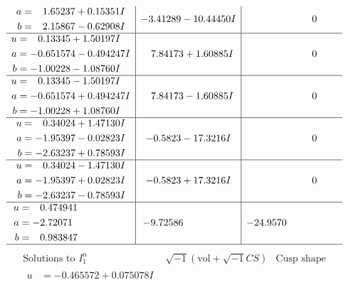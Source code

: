 \documentclass[1p]{elsarticle_modified}
\theoremstyle{definition}
\newcommand{\I}{\sqrt{-1}}
\begin{document}
$$\begin{array}{c|c|c}
\begin{aligned}
a &= \phantom{-}1.65237 + 0.15351 I \\
b &= \phantom{-}2.15867 - 0.62908 I\end{aligned}
 & -3.41289 - 10.44450 I & \phantom{-0.000000 } 0 \\ \hline\begin{aligned}
u &= \phantom{-}0.13345 + 1.50197 I \\
a &= -0.651574 - 0.494247 I \\
b &= -1.00228 - 1.08760 I\end{aligned}
 & \phantom{-}7.84173 + 1.60885 I & \phantom{-0.000000 } 0 \\ \hline\begin{aligned}
u &= \phantom{-}0.13345 - 1.50197 I \\
a &= -0.651574 + 0.494247 I \\
b &= -1.00228 + 1.08760 I\end{aligned}
 & \phantom{-}7.84173 - 1.60885 I & \phantom{-0.000000 } 0 \\ \hline\begin{aligned}
u &= \phantom{-}0.34024 + 1.47130 I \\
a &= -1.95397 - 0.02823 I \\
b &= -2.63237 + 0.78593 I\end{aligned}
 & -0.5823 - 17.3216 I & \phantom{-0.000000 } 0 \\ \hline\begin{aligned}
u &= \phantom{-}0.34024 - 1.47130 I \\
a &= -1.95397 + 0.02823 I \\
b &= -2.63237 - 0.78593 I\end{aligned}
 & -0.5823 + 17.3216 I & \phantom{-0.000000 } 0 \\ \hline\begin{aligned}
u &= \phantom{-}0.474941\phantom{ +0.000000I} \\
a &= -2.72071\phantom{ +0.000000I} \\
b &= \phantom{-}0.983847\phantom{ +0.000000I}\end{aligned}
 & -9.72586\phantom{ +0.000000I} & -24.9570\phantom{ +0.000000I}\\
 \hline 
 \end{array}$$\newpage$$\begin{array}{c|c|c}  
\text{Solutions to }I^u_{1}& \I (\text{vol} + \sqrt{-1}CS) & \text{Cusp shape}\\
 \hline 
\begin{aligned}
u &= -0.465572 + 0.075078 I \\

\end{aligned}
\end{array}$$
\end{document}
